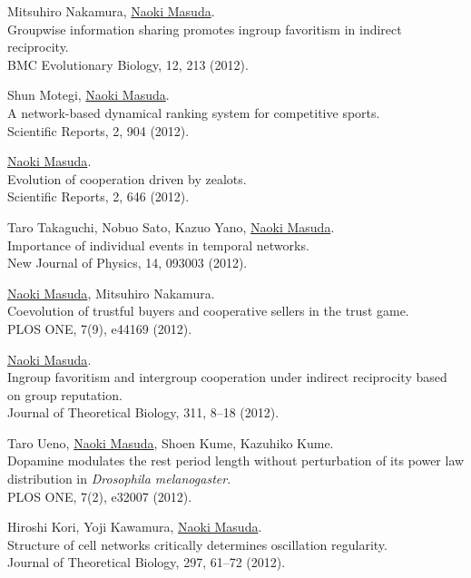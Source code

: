 \documentclass[11pt,letter]{article}
\begin{document}
\begin{etaremune}
\item Mitsuhiro Nakamura, \underline{Naoki Masuda}.\\
Groupwise information sharing promotes ingroup favoritism in indirect reciprocity.\\
BMC Evolutionary Biology, 12, 213 (2012).

\item Shun Motegi, \underline{Naoki Masuda}.\\
A network-based dynamical ranking system for competitive sports.\\
Scientific Reports, 2, 904 (2012).

\item \underline{Naoki Masuda}.\\
Evolution of cooperation driven by zealots.\\
Scientific Reports, 2, 646 (2012).

\item Taro Takaguchi, Nobuo Sato, Kazuo Yano, \underline{Naoki Masuda}.\\
Importance of individual events in temporal networks.\\
New Journal of Physics, 14, 093003 (2012).

\item \underline{Naoki Masuda}, Mitsuhiro Nakamura.\\
Coevolution of trustful buyers and cooperative sellers in the trust game.\\
PLOS ONE, 7(9), e44169 (2012).

\item \underline{Naoki Masuda}.\\
Ingroup favoritism and intergroup cooperation under indirect reciprocity based on group reputation.\\
Journal of Theoretical Biology, 311, 8--18 (2012).

\item Taro Ueno, \underline{Naoki Masuda}, Shoen Kume, Kazuhiko Kume.\\
Dopamine modulates the rest period length without perturbation of its power law distribution in \textit{Drosophila melanogaster}.\\
PLOS ONE, 7(2), e32007 (2012).

\item Hiroshi Kori, Yoji Kawamura, \underline{Naoki Masuda}.\\
Structure of cell networks critically determines oscillation regularity.\\
Journal of Theoretical Biology, 297, 61--72 (2012).


\end{etaremune}
\end{document}
